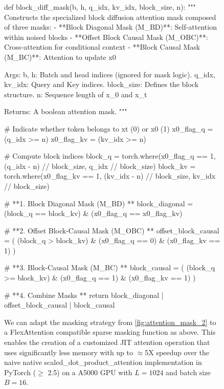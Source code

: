 \documentclass{article} %
\begin{document}
\begin{figure}
    \centering
    
\begin{minipage}{\linewidth}
\begin{python}
def block_diff_mask(b, h, q_idx, kv_idx, block_size, n):
    """
    Constructs the specialized block diffusion attention mask composed of three masks:
    - **Block Diagonal Mask (M_BD)**: Self-attention within noised blocks
    - **Offset Block Causal Mask (M_OBC)**: Cross-attention for conditional context
    - **Block Causal Mask (M_BC)**: Attention to update x0
    
    Args:
      b, h: Batch and head indices (ignored for mask logic).
      q_idx, kv_idx: Query and Key indices.
      block_size: Defines the block structure.
      n: Sequence length of x_0 and x_t

    
    Returns:
      A boolean attention mask.
    """
    
    # Indicate whether token belongs to xt (0) or x0 (1)
    x0_flag_q = (q_idx >= n)
    x0_flag_kv = (kv_idx >= n)
    
    # Compute block indices
    block_q = torch.where(x0_flag_q == 1,
                        (q_idx - n) // block_size,
                        q_idx // block_size)
    block_kv = torch.where(x0_flag_kv == 1,
                        (kv_idx - n) // block_size,
                        kv_idx // block_size)
    
    # **1. Block Diagonal Mask (M_BD) **
    block_diagonal = (block_q == block_kv) & (x0_flag_q == x0_flag_kv)
    
    # **2. Offset Block-Causal Mask (M_OBC) **
    offset_block_causal = (
        (block_q > block_kv)
        & (x0_flag_q == 0)
        & (x0_flag_kv == 1)
    )
    
    # **3. Block-Causal Mask (M_BC) **
    block_causal = (
        (block_q >= block_kv)
        & (x0_flag_q == 1)
        & (x0_flag_kv == 1)
    )
    
    # **4. Combine Masks **
    return block_diagonal | offset_block_causal | block_causal
    
\end{python}
\label{py::flex-attention}
\end{minipage}
    \caption{We can adapt the masking strategy from \cref{fig:attention_mask_2} to a FlexAttention compatible sparse masking function as above. This enables the creation of a customized JIT attention operation that uses significantly less memory with up to $\approx$5X speedup over the naive native scaled\_dot\_product\_attention implementation in PyTorch ($\geq$ 2.5) on a A5000 GPU with $L=1024$ and batch size $B=16$.}
    \label{fig:flex-attn-mask}
\end{figure}
\end{document}
